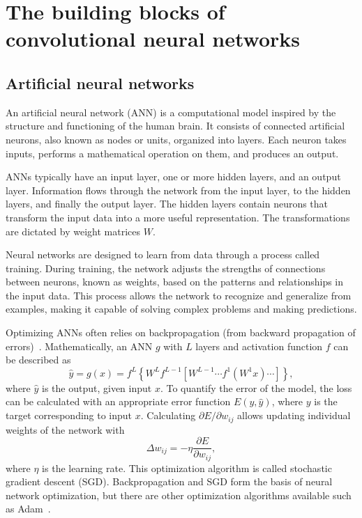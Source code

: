 \section[CNN building blocks]{The building blocks of convolutional neural networks}

\subsection{Artificial neural networks}
An artificial neural network (ANN) is a computational model inspired by the structure and functioning of the human brain.
It consists of connected artificial neurons, also known as nodes or units, organized into layers.
Each neuron takes inputs, performs a mathematical operation on them, and produces an output.

ANNs typically have an input layer, one or more hidden layers, and an output layer.
Information flows through the network from the input layer, to the hidden layers, and finally the output layer.
The hidden layers contain neurons that transform the input data into a more useful representation.
The transformations are dictated by weight matrices $W$.

Neural networks are designed to learn from data through a process called training.
During training, the network adjusts the strengths of connections between neurons, known as weights, based on the patterns and relationships in the input data.
This process allows the network to recognize and generalize from examples, making it capable of solving complex problems and making predictions.

Optimizing ANNs often relies on backpropagation (from backward propagation of errors)~.
Mathematically, an ANN $g$ with $L$ layers and activation function $f$ can be described as
\begin{equation}
    \hat{y} = g(x) = f^L \left\{W^L f^{L-1} \left[W^{L-1} \cdots f^1 \left(W^1 x\right) \cdots \right] \right\},
\end{equation}
where $\hat{y}$ is the output, given input $x$.
To quantify the error of the model, the loss can be calculated with an appropriate error function $E(y, \hat{y})$, where $y$ is the target corresponding to input $x$.
Calculating $\partial E / \partial w_{ij}$ allows updating individual weights of the network with \eg
\begin{equation}
    \Delta w_{ij} = -\eta \frac{\partial E}{\partial w_{ij}},
\end{equation}
where $\eta$ is the learning rate.
This optimization algorithm is called stochastic gradient descent (SGD).
Backpropagation and SGD form the basis of neural network optimization, but there are other optimization algorithms available such as Adam~.

